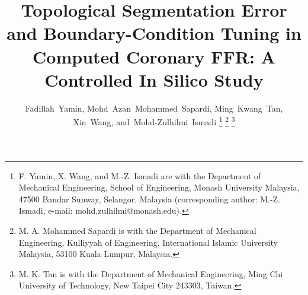 \documentclass[journal,twoside,web]{ieeecolor}
\begin{document}

\title{Topological Segmentation Error and Boundary-Condition Tuning in Computed Coronary FFR: A Controlled In
Silico Study}

\author{Fadillah~Yamin,
        Mohd~Azan~Mohammed~Sapardi,
        Ming~Kwang~Tan,
        Xin~Wang,
        and~\mbox{Mohd-Zulhilmi~Ismadi}\endgraf\vspace{-\baselineskip}%
\thanks{F. Yamin, X. Wang, and M.-Z. Ismadi are with the Department of Mechanical Engineering, School of
Engineering, Monash University Malaysia, 47500 Bandar Sunway, Selangor, Malaysia (corresponding author:
M.-Z. Ismadi, e-mail: mohd.zulhilmi@monash.edu).}%
\thanks{M. A. Mohammed Sapardi is with the Department of Mechanical Engineering, Kulliyyah of Engineering,
International Islamic University Malaysia, 53100 Kuala Lumpur, Malaysia.}%
\thanks{M. K. Tan is with the Department of Mechanical Engineering, Ming Chi University of Technology, New Taipei
City 243303, Taiwan.}}


\maketitle
\end{document}
